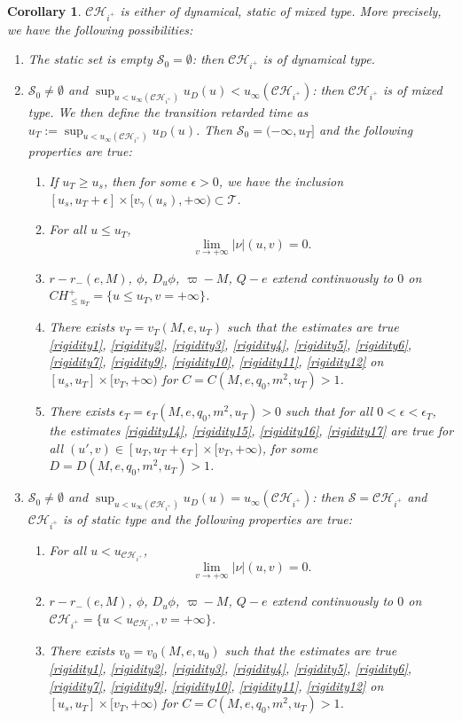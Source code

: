 \documentclass[10pt,a4paper]{article}
\theoremstyle{plain}
\newtheorem{cor}[thm]{Corollary}
\theoremstyle{remark}
\theoremstyle{definition}
\theoremstyle{plain}
\theoremstyle{remark}
\theoremstyle{definition}
\newcommand{\CH}{\mathcal{CH}_{i^+}}
\numberwithin{equation}{section}
\begin{document}
\begin{cor} \label{threetypes}
	$\CH$ is either of dynamical, static of mixed type. More precisely, we have the following possibilities:
	\begin{enumerate}
		\item The static set is empty $\mathcal{S}_0 = \emptyset$: then $\CH$ is of dynamical type.
		
		\item $\mathcal{S}_0 \neq  \emptyset$ and $\sup_{u <u_{\infty}(\CH)} u_D(u) <u_{\infty}(\CH)$: then $\CH$ is of mixed type. We then define the transition retarded time as $u_T:=\sup_{u <u_{\infty}(\CH)} u_D(u)$. Then $\mathcal{S}_0=(-\infty,u_T]$ and the following properties are true:  \begin{enumerate}
			\item \label{a}If $u_T \geq u_s$, then for some $\epsilon>0$, we have the inclusion $[u_s,u_T+\epsilon] \times [v_{\gamma}(u_s),+\infty) \subset \mathcal{T}$.
			\item \label{b}For all $u \leq u_T$, $$\lim_{v \rightarrow +\infty}|\nu|(u,v)=0.$$
			\item \label{c} $r-r_-(e,M)$, $\phi$, $D_u \phi$, $\varpi-M$, $Q-e$ extend continuously to $0$ on  $CH^+_{\leq u_T}=\{ u \leq u_T, v=+\infty\}$.
			\item \label{d} There exists $v_T=v_T(M,e,u_T)$ such that the estimates are true \eqref{rigidity1}, \eqref{rigidity2}, \eqref{rigidity3}, \eqref{rigidity4}, \eqref{rigidity5}, \eqref{rigidity6}, \eqref{rigidity7}, \eqref{rigidity9}, \eqref{rigidity10}, \eqref{rigidity11}, \eqref{rigidity12} on $[u_s,u_T] \times [v_T,+\infty)$ for $C=C(M,e,q_0,m^2,u_T)>1$.
			\item \label{e} There exists $\epsilon_T=\epsilon_T(M,e,q_0,m^2,u_T)>0$ such that for all $0<\epsilon<\epsilon_T$, the estimates \eqref{rigidity14}, \eqref{rigidity15}, \eqref{rigidity16}, \eqref{rigidity17} are true for all $(u',v) \in [u_T,u_T+\epsilon_T] \times [v_T,+\infty)$, for some $D=D(M,e,q_0,m^2,u_T)>1$.
			
		\end{enumerate}
		\item \label{rigid} $\mathcal{S}_0 \neq  \emptyset$ and $\sup_{u <u_{\infty}(\CH)} u_D(u) =u_{\infty}(\CH)$: then $\mathcal{S}=\CH$ and $\CH$ is of static type and the following properties are true:  \begin{enumerate}
			
			\item For all $u < u_{\CH}$, $$\lim_{v \rightarrow +\infty}|\nu|(u,v)=0.$$
			\item  $r-r_-(e,M)$, $\phi$, $D_u \phi$, $\varpi-M$, $Q-e$ extend continuously to $0$ on $\CH=\{ u < u_{\CH}, v=+\infty\}$.
			\item There exists $v_0=v_0(M,e,u_0)$ such that the estimates are true \eqref{rigidity1}, \eqref{rigidity2}, \eqref{rigidity3}, \eqref{rigidity4}, \eqref{rigidity5}, \eqref{rigidity6}, \eqref{rigidity7}, \eqref{rigidity9}, \eqref{rigidity10}, \eqref{rigidity11}, \eqref{rigidity12} on $[u_s,u_T] \times [v_T,+\infty)$ for $C=C(M,e,q_0,m^2,u_T)>1$. \end{enumerate}
	\end{enumerate}
	

\end{cor}
\end{document}
